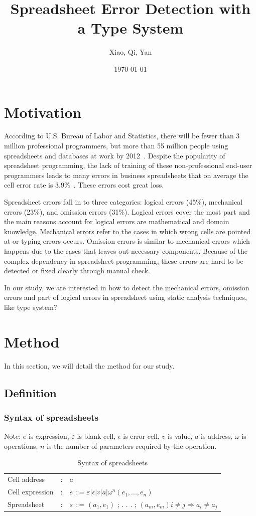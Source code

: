 \documentclass[a4paper]{article}
\title{Spreadsheet Error Detection with a Type System}
\author{Xiao, Qi, Yan}
\date{\today}
\begin{document}
\maketitle


\section{Motivation}
According to U.S. Bureau of Labor and Statistics, there will be fewer than 3 million professional programmers, but more than 55 million people using spreadsheets and databases at work by 2012~\cite{scaffidi2005}. Despite the popularity of spreadsheet programming, the lack of training of these non-professional end-user programmers leads to many errors in business spreadsheets that on average the cell error rate is 3.9\%~\cite{panko2016we}. These errors cost great loss.

Spreadsheet errors fall in to three categories: logical errors (45\%), mechanical errors (23\%), and omission errors (31\%). Logical errors cover the most part and the main reasons account for logical errors are mathematical and domain knowledge. Mechanical errors refer to the cases in which wrong cells are pointed at or typing errors occurs. Omission errors is similar to mechanical errors which happens due to the cases that leaves out necessary components. Because of the complex dependency in spreadsheet programming, these errors are hard to be detected or fixed clearly through manual check.

In our study, we are interested in how to detect the mechanical errors, omission errors and part of logical errors in spreadsheet using static analysis techniques, like type system? 

\section{Method}
In this section, we will detail the method for our study.
\subsection{Definition}
\subsubsection{Syntax of spreadsheets}
Note: $e$ is expression, $\varepsilon$ is blank cell, $\epsilon$ is error cell, $v$ is value, $a$ is address, $\omega$ is operations, $n$ is the number of parameters required by the operation.
\begin{table}[h]
\centering
\caption{Syntax of spreadsheets}
\begin{tabular}{lll}
\hline
Cell address& : & $a$\\
Cell expression& : & $e$ ::= $\varepsilon | \epsilon | v | a | \omega^{n}(e_1, . . . , e_n)$\\
Spreadsheet&:& $s$ ::= $(a_1, e_1)$ ; . . . ; $(a_m, e_m) i \neq j \Rightarrow a_i \neq a_j$\\
\hline
  \end{tabular}
\label{syntax}
\end{table}
\end{document}
